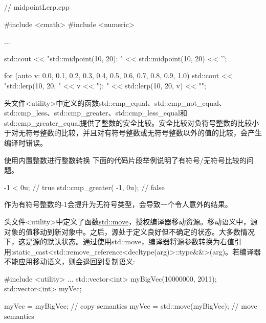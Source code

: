 \begin{cpp}
// midpointLerp.cpp

#include <cmath>
#include <numeric>

...

std::cout << "std::midpoint(10, 20): " << std::midpoint(10, 20) << '\n';

for (auto v: {0.0, 0.1, 0.2, 0.3, 0.4, 0.5, 0.6, 0.7, 0.8, 0.9, 1.0}) {
	std::cout << "std::lerp(10, 20, " << v << "): " << std::lerp(10, 20, v) << "\n";
}
\end{cpp}





头文件<utility>中定义的函数std::cmp\_equal、std::cmp\_not\_equal、std::cmp\_less、std::cmp\_greater、std::cmp\_less\_equal和std::cmp\_greater\_equal提供了整数的安全比较。安全比较对负符号整数的比较小于对无符号整数的比较，并且对有符号整数或无符号整数以外的值的比较，会产生编译时错误。


\begin{myWarning}{使用内置整数进行整数转换}
下面的代码片段举例说明了有符号/无符号比较的问题。

\begin{cpp}
-1 < 0u; // true
std::cmp_greater( -1, 0u); // false
\end{cpp}

作为有符号整数的-1会提升为无符号类型，会导致一个令人意外的结果。

\end{myWarning}


头文件<utility>中定义了函数\href{http://en.cppreference.com/w/cpp/utility/move}{std::move}，授权编译器移动资源。移动语义中，源对象的值移动到新对象中。之后，源处于定义良好但不确定的状态。大多数情况下，这是源的默认状态。通过使用std::move，编译器将源参数转换为右值引用:static\_cast<std::remove\_reference<decltype(arg)>::type\&\&>(arg)。若编译器不能应用移动语义，则会退回到复制语义:

\begin{cpp}
#include <utility>
...
std::vector<int> myBigVec(10000000, 2011);
std::vector<int> myVec;

myVec = myBigVec; // copy semantics
myVec = std::move(myBigVec); // move semantics
\end{cpp}



